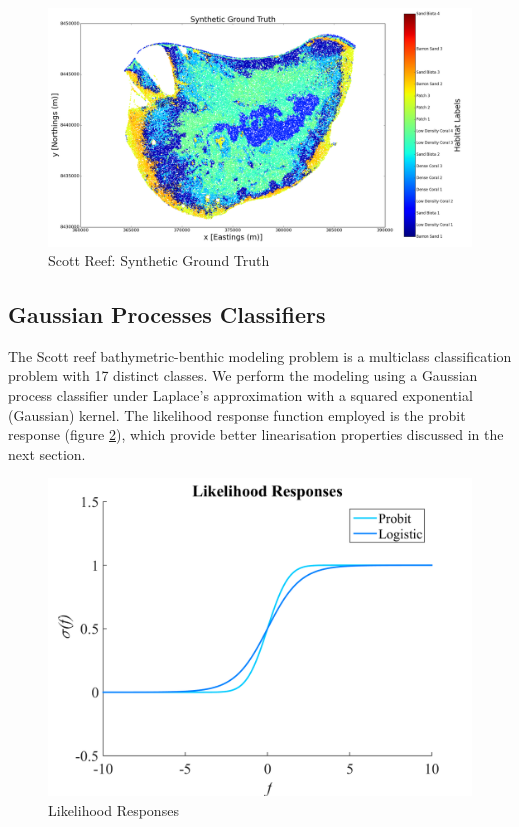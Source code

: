 \documentclass{article}
\begin{document}
		\begin{figure}[!htbp]
		\centering
			\includegraphics[width = \linewidth]{Figures/scott_reef_modeling/Figure7.png}
		\caption{Scott Reef: Synthetic Ground Truth}
		\label{Figure:Results:ScottReefSyntheticTruth}
		\end{figure}
		
	\subsection{Gaussian Processes Classifiers}

		The Scott reef bathymetric-benthic modeling problem is a multiclass classification problem with 17 distinct classes. We perform the modeling using a Gaussian process classifier under Laplace's approximation with a squared exponential (Gaussian) kernel. The likelihood response function employed is the probit response (figure \ref{Figure:LikelihoodResponses}), which provide better linearisation properties discussed in the next section.
		
		\begin{figure}[!htbp]
			\centering
				\includegraphics[width = \linewidth]{Figures/responses.png}
			\caption{Likelihood Responses}
			\label{Figure:LikelihoodResponses}
		\end{figure}
				
\end{document}
